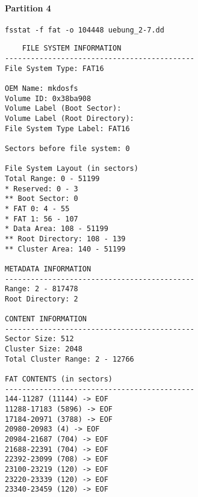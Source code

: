 \documentclass[10pt,a4paper]{article}
\begin{document}
\paragraph{Partition 4}
\Verb+fsstat -f fat -o 104448 uebung_2-7.dd+
\begin{lstlisting}
    FILE SYSTEM INFORMATION
--------------------------------------------
File System Type: FAT16

OEM Name: mkdosfs
Volume ID: 0x38ba908
Volume Label (Boot Sector):            
Volume Label (Root Directory):
File System Type Label: FAT16   

Sectors before file system: 0

File System Layout (in sectors)
Total Range: 0 - 51199
* Reserved: 0 - 3
** Boot Sector: 0
* FAT 0: 4 - 55
* FAT 1: 56 - 107
* Data Area: 108 - 51199
** Root Directory: 108 - 139
** Cluster Area: 140 - 51199

METADATA INFORMATION
--------------------------------------------
Range: 2 - 817478
Root Directory: 2

CONTENT INFORMATION
--------------------------------------------
Sector Size: 512
Cluster Size: 2048
Total Cluster Range: 2 - 12766

FAT CONTENTS (in sectors)
--------------------------------------------
144-11287 (11144) -> EOF
11288-17183 (5896) -> EOF
17184-20971 (3788) -> EOF
20980-20983 (4) -> EOF
20984-21687 (704) -> EOF
21688-22391 (704) -> EOF
22392-23099 (708) -> EOF
23100-23219 (120) -> EOF
23220-23339 (120) -> EOF
23340-23459 (120) -> EOF
\end{lstlisting}
\end{document}
